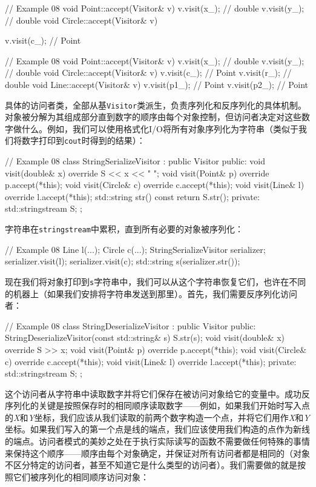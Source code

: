 \begin{code}
// Example 08
void Point::accept(Visitor& v) {
  v.visit(x_); // double
  v.visit(y_); // double
}
void Circle::accept(Visitor& v) {
  v.visit(c_); // Point
  \begin{code}
// Example 08
void Point::accept(Visitor& v) {
  v.visit(x_); // double
  v.visit(y_); // double
}
void Circle::accept(Visitor& v) {
  v.visit(c_); // Point
  v.visit(r_); // double
}
void Line::accept(Visitor& v) {
  v.visit(p1_); // Point
  v.visit(p2_); // Point
}
\end{code}

具体的访问者类，全部从基\texttt{Visitor}类派生，负责序列化和反序列化的具体机制。对象被分解为其组成部分直到数字的顺序由每个对象控制，但访问者决定对这些数字做什么。例如，我们可以使用格式化I/O将所有对象序列化为字符串（类似于我们将数字打印到\texttt{cout}时得到的结果）：

\begin{code}
// Example 08
class StringSerializeVisitor : public Visitor {
public:
  void visit(double& x) override { S << x << " "; }
  void visit(Point& p) override { p.accept(*this); }
  void visit(Circle& c) override { c.accept(*this); }
  void visit(Line& l) override { l.accept(*this); }
  std::string str() const { return S.str(); }
  private:
  std::stringstream S;
};
\end{code}

字符串在\texttt{stringstream}中累积，直到所有必要的对象被序列化：

\begin{code}
// Example 08
Line l(...);
Circle c(...);
StringSerializeVisitor serializer;
serializer.visit(l);
serializer.visit(c);
std::string s(serializer.str());
\end{code}

现在我们将对象打印到\texttt{s}字符串中，我们可以从这个字符串恢复它们，也许在不同的机器上（如果我们安排将字符串发送到那里）。首先，我们需要反序列化访问者：

\begin{code}
// Example 08
class StringDeserializeVisitor : public Visitor {
  public:
  StringDeserializeVisitor(const std::string& s) {
    S.str(s);
  }
  void visit(double& x) override { S >> x; }
  void visit(Point& p) override { p.accept(*this); }
  void visit(Circle& c) override { c.accept(*this); }
  void visit(Line& l) override { l.accept(*this); }
  private:
  std::stringstream S;
};
\end{code}

这个访问者从字符串中读取数字并将它们保存在被访问对象给它的变量中。成功反序列化的关键是按照保存时的相同顺序读取数字——例如，如果我们开始时写入点的\emph{X}和\emph{Y}坐标，我们应该从我们读取的前两个数字构造一个点，并将它们用作\emph{X}和\emph{Y}坐标。如果我们写入的第一个点是线的端点，我们应该使用我们构造的点作为新线的端点。访问者模式的美妙之处在于执行实际读写的函数不需要做任何特殊的事情来保持这个顺序——顺序由每个对象确定，并保证对所有访问者都是相同的（对象不区分特定的访问者，甚至不知道它是什么类型的访问者）。我们需要做的就是按照它们被序列化的相同顺序访问对象：

}
\end{code}
